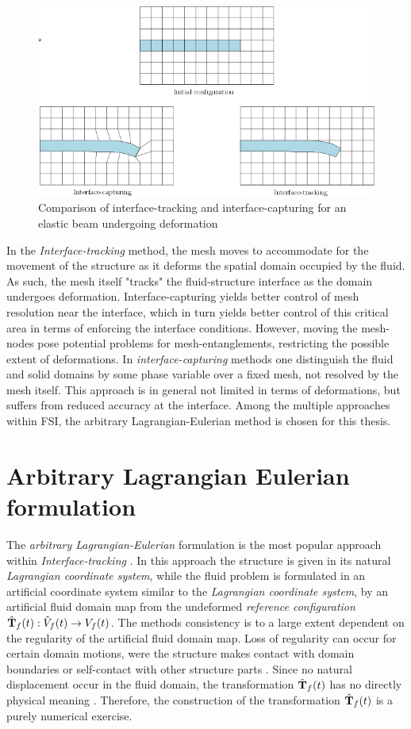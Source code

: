 \begin{figure}[h!]
  \centering
    \includegraphics[scale=0.5]{./Fig/interface.png}
      \caption{Comparison of interface-tracking and interface-capturing for an elastic beam undergoing deformation}
      \label{fig:captrack}
\end{figure}

In the \textit{Interface-tracking} method, the mesh moves to accommodate for the movement of the structure as it deforms the spatial domain occupied by the fluid. As such, the mesh itself "tracks" the fluid-structure interface as the domain undergoes deformation. Interface-capturing yields better control of mesh resolution near the interface, which in turn yields better control of this critical area in terms of enforcing the interface conditions.
However, moving the mesh-nodes pose potential problems for mesh-entanglements, restricting the possible extent of deformations. In \textit{interface-capturing} methods one distinguish the fluid and solid domains by some phase variable over a fixed mesh, not resolved by the mesh itself. This approach is in general not limited in terms of deformations, but suffers from reduced accuracy at the interface. Among the multiple approaches within FSI, the arbitrary Lagrangian-Eulerian method is chosen for this thesis. 


\section{Arbitrary Lagrangian Eulerian formulation}
The \textit{arbitrary Lagrangian-Eulerian} formulation is the most popular approach within \textit{Interface-tracking} \cite{Richter2010c, Frei2016a}. In this approach the structure is given in its natural \textit{Lagrangian coordinate system}, while the fluid problem is formulated in an artificial coordinate system similar to the \textit{Lagrangian coordinate system}, by an artificial fluid domain map from the undeformed \textit{reference configuration} $\hat{\mathbf{T}}_f (t): \hat{V}_f (t) \rightarrow V_f (t)$. The methods consistency is to a large extent dependent on the regularity of the artificial fluid domain map. Loss of regularity can occur for certain domain motions, were the structure makes contact with domain boundaries or self-contact with other structure parts \cite{Richter2010b}. Since no natural displacement occur in the fluid domain, the transformation $\hat{\mathbf{T}}_f (t)$ has no directly physical meaning \cite{Richter2010c, Donea2004}. Therefore, the construction of the transformation $\hat{\mathbf{T}}_f (t)$ is a purely numerical exercise.

